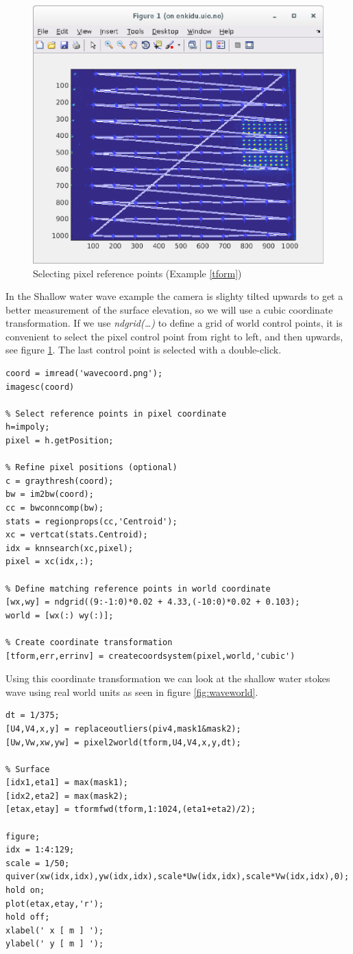 \documentclass[10pt]{article}
\renewcommand{\lstlistingname}{Example}
\begin{document}
\begin{figure}[htp]  
  \centering
  \includegraphics[width=.6\textwidth]{pixelcoord.eps}
  \caption{Selecting pixel reference points ({\lstlistingname} \ref{tform})}
  \label{fig:controlpoints}
\end{figure}
  
 In the Shallow water wave example the camera is slighty tilted upwards to get a better measurement of the surface elevation,
 so we will use a cubic coordinate transformation.
 If we use \emph{ndgrid(\ldots)} to define a grid of world control points, 
 it is convenient to select the pixel control point from right to left, and then upwards, see figure \ref{fig:controlpoints}.
 The last control point is selected with a double-click.
\begin{lstlisting}[caption=Creating a coordinate system,label=tform]
coord = imread('wavecoord.png');
imagesc(coord)
 
% Select reference points in pixel coordinate
h=impoly;
pixel = h.getPosition;

% Refine pixel positions (optional)
c = graythresh(coord);
bw = im2bw(coord);
cc = bwconncomp(bw);
stats = regionprops(cc,'Centroid');
xc = vertcat(stats.Centroid);
idx = knnsearch(xc,pixel);
pixel = xc(idx,:);
 
% Define matching reference points in world coordinate
[wx,wy] = ndgrid((9:-1:0)*0.02 + 4.33,(-10:0)*0.02 + 0.103);
world = [wx(:) wy(:)];
  
% Create coordinate transformation
[tform,err,errinv] = createcoordsystem(pixel,world,'cubic')   
\end{lstlisting}
  
Using this coordinate transformation we can look at the shallow water stokes wave using real world units as seen in figure \ref{fig:waveworld}.
\begin{lstlisting}[caption=Using the coordinate transform,label=wave]
dt = 1/375;
[U4,V4,x,y] = replaceoutliers(piv4,mask1&mask2);     
[Uw,Vw,xw,yw] = pixel2world(tform,U4,V4,x,y,dt);

% Surface 
[idx1,eta1] = max(mask1); 
[idx2,eta2] = max(mask2); 
[etax,etay] = tformfwd(tform,1:1024,(eta1+eta2)/2);

figure;
idx = 1:4:129;
scale = 1/50;
quiver(xw(idx,idx),yw(idx,idx),scale*Uw(idx,idx),scale*Vw(idx,idx),0);
hold on;
plot(etax,etay,'r');
hold off;
xlabel(' x [ m ] ');
ylabel(' y [ m ] ');
\end{lstlisting}
\end{document}
